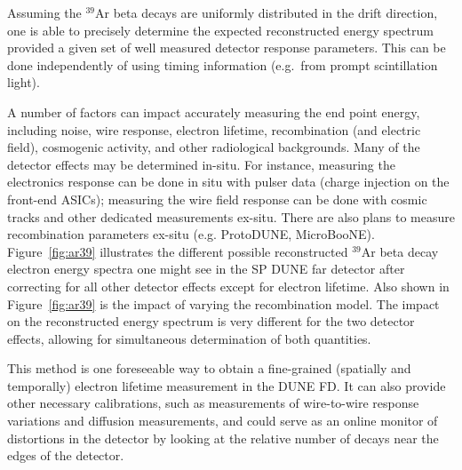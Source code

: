 Assuming the $^{39}$Ar beta decays are uniformly distributed in the drift direction, one is able to precisely determine the expected reconstructed energy spectrum 
provided a given set of well measured detector response parameters.  This can be done independently of using timing information (e.g.~from prompt scintillation light). 

A number of factors can impact accurately measuring the end point energy, including noise, wire response, electron lifetime, recombination (and electric field), cosmogenic activity, and other radiological backgrounds.
Many of the detector effects may be determined in-situ.  For instance, measuring the electronics response can be done in situ with pulser data (charge injection on the front-end ASICs); measuring the wire field response can be done with cosmic tracks and other dedicated measurements ex-situ. There are also plans to measure recombination parameters ex-situ (e.g. ProtoDUNE, MicroBooNE). Figure~\ref{fig:ar39} illustrates the different possible reconstructed $^{39}$Ar beta decay electron energy spectra one might see in the SP DUNE far detector after correcting for all other detector effects except for electron lifetime.
Also shown in Figure~\ref{fig:ar39} is the impact of varying the 
recombination model.
The impact on the reconstructed energy spectrum is very different for the two detector effects, allowing for simultaneous determination of both quantities.




This method is one foreseeable way to obtain a fine-grained (spatially and temporally) electron lifetime measurement in the DUNE FD.  It can also provide other necessary calibrations, such as measurements of wire-to-wire response variations and diffusion measurements, 
and could serve as an online monitor of 
\efield distortions in the detector by looking at the relative number of decays 
near the edges of the 
detector.  

